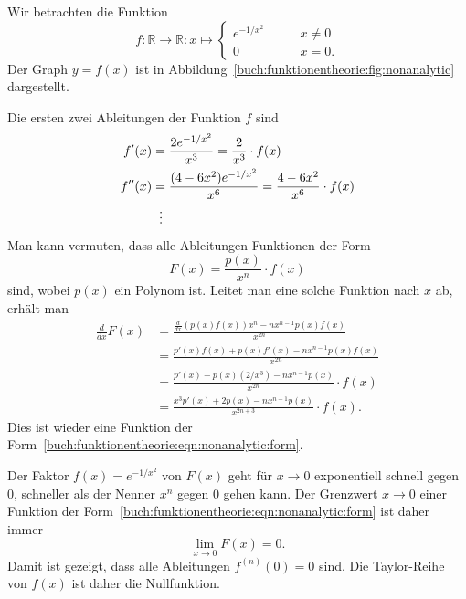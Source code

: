 \begin{beispiel}
\label{buch:funktionentheorie:beispiel:nichtanalytisch}
Wir betrachten die Funktion
\[
f\colon \mathbb{R}\to\mathbb{R}
:
x \mapsto
\begin{cases}
e^{-1/x^2}&\qquad x\ne 0\\
0&\qquad x=0.
\end{cases}
\]
Der Graph $y=f(x)$ ist in Abbildung~\ref{buch:funktionentheorie:fig:nonanalytic}
dargestellt.

Die ersten zwei Ableitungen der Funktion $f$ sind
\begin{align*}
f'(x) &= \frac{2e^{-1/x^2}}{x^3} = \frac{2}{x^3}\cdot f(x)
\\
f''(x) &= \frac{(4-6x^2) e^{-1/x^2}}{x^6} = \frac{4-6x^2}{x^6}\cdot f(x)
\\
&\hspace*{2mm}\vdots
\end{align*}
Man kann vermuten, dass alle
Ableitungen Funktionen der Form
\begin{equation}
F(x) = \frac{p(x)}{x^n} \cdot f(x)
\label{buch:funktionentheorie:eqn:nonanalytic:form}
\end{equation}
sind,
wobei $p(x)$ ein Polynom ist.
Leitet man eine solche Funktion nach $x$ ab, erhält man
\begin{align*}
\frac{d}{dx} F(x)
&=
\frac{\frac{d}{dx}(p(x)f(x)) x^n - nx^{n-1}p(x)f(x)}{x^{2n}}
\\
&=
\frac{p'(x)f(x) + p(x)f'(x) - nx^{n-1}p(x)f(x)}{x^{2n}} 
\\
&=
\frac{p'(x) + p(x)(2/x^3) - nx^{n-1}p(x)}{x^{2n}} \cdot f(x)
\\
&=
\frac{x^3p'(x)+2p(x)-nx^{n-1}p(x)}{x^{2n+3}}\cdot f(x).
\end{align*}
Dies ist wieder eine Funktion der
Form~\eqref{buch:funktionentheorie:eqn:nonanalytic:form}.

Der Faktor $f(x)=e^{-1/x^2}$ von $F(x)$ geht für $x\to 0$ exponentiell
schnell gegen $0$, schneller als der Nenner $x^n$ gegen $0$ gehen
kann. 
Der Grenzwert $x\to 0$ einer Funktion der 
Form~\eqref{buch:funktionentheorie:eqn:nonanalytic:form}
ist daher immer
\[
\lim_{x\to 0}  F(x) =0.
\]
Damit ist gezeigt, dass alle Ableitungen $f^{(n)}(0)=0$ sind.
Die Taylor-Reihe von $f(x)$ ist daher die Nullfunktion.
\end{beispiel}

%

